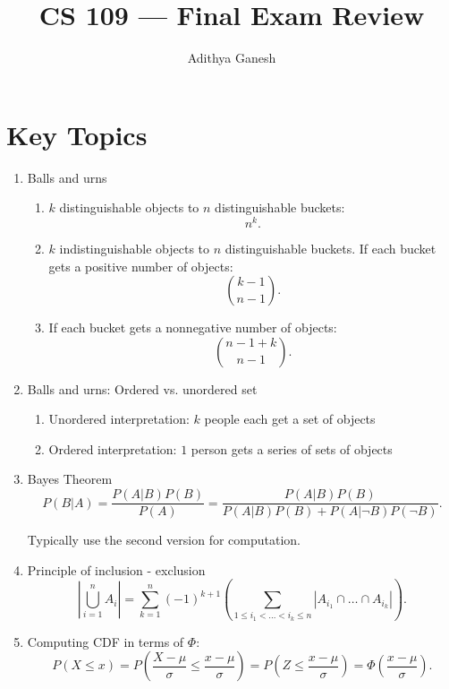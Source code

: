 \documentclass{article}
\title{CS 109 --- Final Exam Review}
\author{Adithya Ganesh}
\newcommand{\bc}{\binom}
\begin{document}
\maketitle
\section{Key Topics}

\begin{enumerate}
  \item Balls and urns
    \begin{enumerate}
      \item $k$ distinguishable objects to $n$ distinguishable buckets:
        \[
          n^k.
        \]
      \item $k$ indistinguishable objects to $n$ distinguishable buckets. If each bucket gets a positive number of objects:
        \[
          \bc{k-1}{n-1}.
        \]

      \item If each bucket gets a nonnegative number of objects:
        \[
          \bc{n-1+k}{n-1}.
        \]
      \end{enumerate}

  \item Balls and urns: Ordered vs. unordered set
    \begin{enumerate}
      \item Unordered interpretation: $k$ people each get a set of objects
      \item Ordered interpretation: $1$ person gets a series of sets of objects
    \end{enumerate}


  \item Bayes Theorem
        \[
          P(B|A) = \frac{P(A|B)P(B)}{P(A)} = \frac{P(A|B)P(B)}{P(A|B)P(B) + P(A | \neg B)P( \neg B)}.
      \]
      
      Typically use the second version for computation.
  \item Principle of inclusion - exclusion
    \[
      \left | \bigcup_{i=1}^{n} A_i \right | =  \sum_{k=1}^{n} (-1)^{k+1}\left(  \sum_{1 \leq i_1 < \dots < i_k \leq n} |A_{i_1} \cap \dots \cap A_{i_k} | \right).
    \]

  \item Computing CDF in terms of $\Phi$:
    \[
      P(X \leq x) =  P(\frac{X-\mu}{\sigma} \leq \frac{x - \mu}{\sigma}) = P(Z \leq \frac{x- \mu}{\sigma}) = \Phi(\frac{x- \mu}{\sigma}).
    \]


\end{enumerate}
\end{document}
